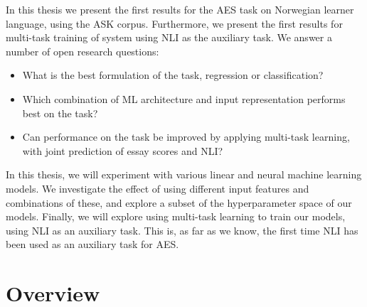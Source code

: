 In this thesis we present the first results for the \ac{AES} task on
Norwegian learner language, using the ASK corpus. Furthermore, we present the
first results for multi-task training of  system using \ac{NLI} as
the auxiliary task. We answer a number of open research questions:

\begin{itemize}
    \item What is the best formulation of the task, regression or
        classification?
    \item Which combination of \ac{ML} architecture and input representation
        performs best on the task?
    \item Can performance on the task be improved by applying multi-task
        learning, with joint prediction of essay scores and \ac{NLI}?
\end{itemize}

In this thesis, we will experiment with various linear and neural machine
learning models. We investigate the effect of using different input features
and combinations of these, and explore a subset of the hyperparameter space
of our models. Finally, we will explore using multi-task learning to train
our models, using \ac{NLI} as an auxiliary task. This is, as far as we know,
the first time \ac{NLI} has been used as an auxiliary task for \ac{AES}.


\section{Overview}

